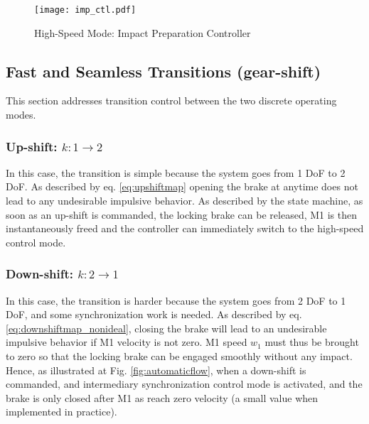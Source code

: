 \begin{figure}[p]
	\centering
		\texttt{[image: imp\_ctl.pdf]}
	\caption{High-Speed Mode: Impact Preparation Controller}
	\label{fig:imp_loop}
\end{figure}



\subsection{Fast and Seamless Transitions (gear-shift)}
\label{sec:fastshifts}

This section addresses transition control between the two discrete operating modes.


\subsubsection{Up-shift: $k:1\rightarrow2$}
In this case, the transition is simple because the system goes from 1 DoF to 2 DoF. As described by eq. \eqref{eq:upshiftmap} opening the brake at anytime does not lead to any undesirable impulsive behavior. As described by the state machine, as soon as an up-shift is commanded, the locking brake can be released, M1 is then instantaneously freed and the controller can immediately switch to the high-speed control mode.
%

\subsubsection{Down-shift: $k:2\rightarrow1$}
In this case, the transition is harder because the system goes from 2 DoF to 1 DoF, and some synchronization work is needed. As described by eq. \eqref{eq:downshiftmap_nonideal}, closing the brake will lead to an undesirable impulsive behavior if M1 velocity is not zero. M1 speed $w_1$ must thus be brought to zero so that the locking brake can be engaged smoothly without any impact. Hence, as illustrated at Fig. \ref{fig:automaticflow}, when a down-shift is commanded, and intermediary synchronization control mode is activated, and the brake is only closed after M1 as reach zero velocity (a small value when implemented in practice). %

